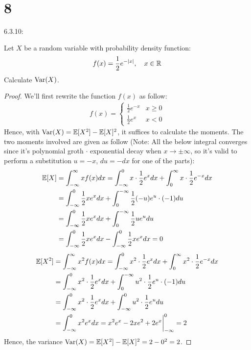 \documentclass{article}
\begin{document}
\newpage
\section*{8}
\begin{ques}\label{q8}
    6.3.10:

    Let $X$ be a random variable with probability density function:
    $$f(x)=\frac{1}{2}e^{-|x|}, \quad x \in\mathbb{R}$$
    Calculate $\mathrm{Var}(X)$.
\end{ques}

\begin{proof}
    We'll first rewrite the function $f(x)$ as follow:
    \begin{align}
        f(x)=\begin{cases}
            \frac{1}{2}e^{-x} & x\geq 0\\
            \frac{1}{2}e^x & x<0
        \end{cases}
    \end{align}
    Hence, with $\mathrm{Var}(X)=\mathbb{E}[X^2]-\mathbb{E}[X]^2$, it suffices to calculate the moments. The two moments involved are given as follow (Note: All the below integral converges since it's polynomial groth $\cdot$ exponential decay when $x\rightarrow \pm\infty$, so it's valid to perform a substitution $u = -x$, $du = -dx$ for one of the parts):
    \begin{align}
        \mathbb{E}[X] &= \int_{-\infty}^{\infty}x f(x)dx = \int_{-\infty}^{0}x\cdot\frac{1}{2}e^x dx + \int_{0}^{\infty}x\cdot\frac{1}{2}e^{-x}dx\\
        &= \int_{-\infty}^{0}\frac{1}{2}xe^{x}dx + \int_{0}^{-\infty}\frac{1}{2}(-u)e^u \cdot (-1)du\\
        &= \int_{-\infty}^{0}\frac{1}{2}xe^{x}dx + \int_{0}^{-\infty}\frac{1}{2}ue^u du\\
        &= \int_{-\infty}^{0}\frac{1}{2}xe^{x}dx-\int_{-\infty}^{0}\frac{1}{2}xe^{x}dx=0
    \end{align}
    \begin{align}
        \mathbb{E}[X^2] &= \int_{-\infty}^{\infty}x^2f(x)dx = \int_{-\infty}^{0}x^2\cdot\frac{1}{2}e^x dx + \int_{0}^{\infty}x^2\cdot\frac{1}{2}e^{-x}dx\\
        &= \int_{-\infty}^{0}x^2\cdot\frac{1}{2}e^x dx + \int_{0}^{-\infty}u^2\cdot \frac{1}{2}e^u\cdot (-1)du\\
        &= \int_{-\infty}^{0}x^2\cdot\frac{1}{2}e^x dx + \int_{-\infty}^{0}u^2\cdot\frac{1}{2}e^u du\\
        &= \int_{-\infty}^{0}x^2e^x dx= x^2e^x - 2xe^2 + 2e^x\bigg|_{-\infty}^{0} = 2
    \end{align}
    Hence, the variance $\mathrm{Var}(X) = \mathbb{E}[X^2]-\mathbb{E}[X]^2 = 2-0^2=2$.
\end{proof}
\end{document}
